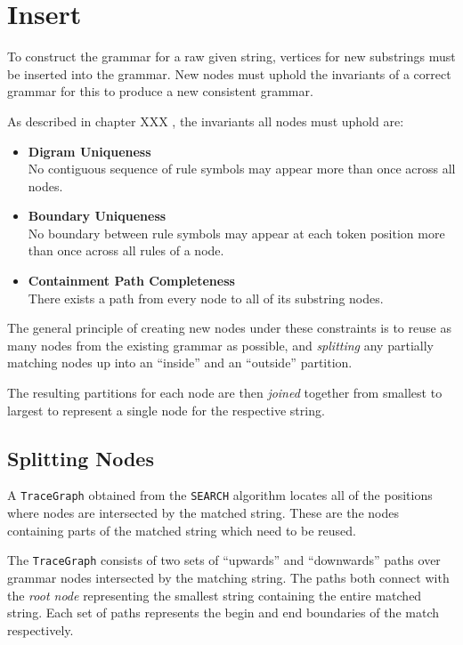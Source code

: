 
\section{Insert}
To construct the grammar for a raw given string, vertices for new substrings must be inserted into the grammar. New nodes must uphold the invariants of a correct grammar for this to produce a new consistent grammar.

As described in chapter XXX , the invariants all nodes must uphold are:
\begin{itemize}
    \item \textbf{Digram Uniqueness}\\
    No contiguous sequence of rule symbols may appear more than once across all nodes.
    \item \textbf{Boundary Uniqueness}\\
    No boundary between rule symbols may appear at each token position more than once across all rules of a node.
    \item \textbf{Containment Path Completeness}\\
    There exists a path from every node to all of its substring nodes. 
\end{itemize}

The general principle of creating new nodes under these constraints is to reuse as many nodes from the existing grammar as possible, and \textit{splitting} any partially matching nodes up into an ``inside'' and an ``outside'' partition.

The resulting partitions for each node are then \textit{joined} together from smallest to largest to represent a single node for the respective string.

\subsection{Splitting Nodes}

A \texttt{TraceGraph} obtained from the \texttt{SEARCH} algorithm locates all of the positions where nodes are intersected by the matched string. These are the nodes containing parts of the matched string which need to be reused.

\noindent The \texttt{TraceGraph} consists of two sets of ``upwards'' and ``downwards'' paths over grammar nodes intersected by the matching string. The paths both connect with the \textit{root node} representing the smallest string containing the entire matched string.
Each set of paths represents the begin and end boundaries of the match respectively. 

